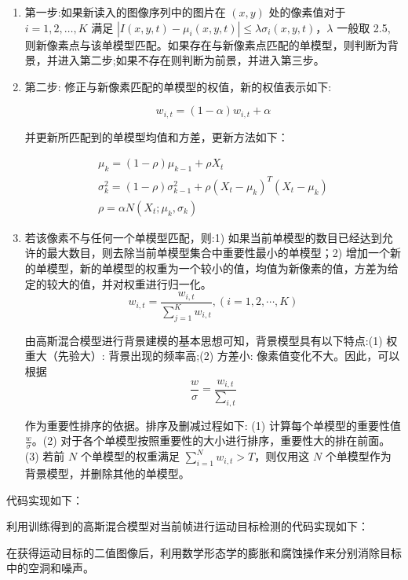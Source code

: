 \begin{enumerate}
	\item 第一步:如果新读入的图像序列中的图片在 $(x,y)$ 处的像素值对于 $i=1,2, \ldots, K$ 满足 $|I(x, y, t)-\mu_i(x,y,t)| \leq \lambda \sigma_i(x, y, t)$，$\lambda$ 一般取 2.5, 则新像素点与该单模型匹配。如果存在与新像素点匹配的单模型，则判断为背景，并进入第二步;如果不存在则判断为前景，并进入第三步。
	\item 第二步: 修正与新像素匹配的单模型的权值，新的权值表示如下:
	\vspace{0.5cm}

	\begin{equation}
	w_{i,t} = (1-\alpha)w_{i,t}+\alpha
	\end{equation}
	
		\vspace{0.3cm}

并更新所匹配到的单模型均值和方差，更新方法如下：
\vspace{0.5cm}

\begin{equation}
\begin{gathered}
\mu_k=(1-\rho) \mu_{k-1}+\rho X_t \\
\sigma_k^2=(1-\rho) \sigma_{k-1}^2+\rho\left(X_t-\mu_k\right)^T\left(X_t-\mu_k\right) \\
\rho=\alpha N\left(X_t ; \mu_k, \sigma_k\right)
\end{gathered}
\end{equation}
\vspace{0.3cm}
	
	\item 若该像素不与任何一个单模型匹配，则:1) 如果当前单模型的数目已经达到允许的最大数目，则去除当前单模型集合中重要性最小的单模型；2) 增加一个新的单模型，新的单模型的权重为一个较小的值，均值为新像素的值，方差为给定的较大的值，并对权重进行归一化。
	\vspace{0.5cm}
	\begin{equation}
w_{i,t}=\frac{w_{i,t}}{\sum_{j=1}^K w_{i,t}},(i=1,2, \cdots, K)
\end{equation}
	\vspace{0.3cm}
	
	由高斯混合模型进行背景建模的基本思想可知，背景模型具有以下特点:(1) 权重大（先验大）: 背景出现的频率高;(2) 方差小: 像素值变化不大。因此，可以根据
	\vspace{0.5cm}
	\begin{equation}
\frac{w}{\sigma}=\frac{w_{i,t}}{\sum\nolimits_{i,t}}
\end{equation}
		\vspace{0.2cm}

作为重要性排序的依据。排序及删减过程如下: (1) 计算每个单模型的重要性值 $\frac{w}{\sigma}$。(2) 对于各个单模型按照重要性的大小进行排序，重要性大的排在前面。(3) 若前 $N$ 个单模型的权重满足 $\sum_{i=1}^N w_{i,t}>T$，则仅用这 $N$ 个单模型作为背景模型，并删除其他的单模型。
\end{enumerate}


代码实现如下：

\vspace{0.3cm}


利用训练得到的高斯混合模型对当前帧进行运动目标检测的代码实现如下：


\vspace{0.3cm}


在获得运动目标的二值图像后，利用数学形态学的膨胀和腐蚀操作来分别消除目标中的空洞和噪声。